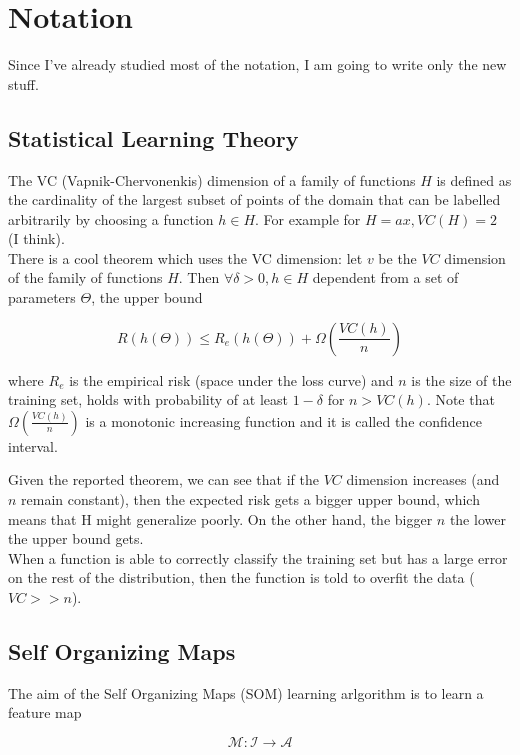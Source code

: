 \section{Notation}

Since I've already studied most of the notation, I am going to write only the new
stuff.

\subsection{Statistical Learning Theory}

The VC (Vapnik-Chervonenkis) dimension of a family of functions $H$ is defined as
the cardinality of the largest subset of points of the domain that can be
labelled arbitrarily by choosing a function $h \in H$.
For example for $H = ax, VC(H) = 2$ (I think).\\
There is a cool theorem which uses the VC dimension: let $v$ be the $VC$
dimension of the family of functions $H$. Then $\forall \delta > 0, h \in H$
dependent from a set of parameters $\Theta$, the upper bound

\begin{equation}
	R(h(\Theta)) \leq R_e(h(\Theta)) + \Omega\left(\frac{VC(h)}{n}\right)
\end{equation}

where $R_e$ is the empirical risk (space under the loss curve) and $n$ is the
size of the training set, holds with probability of at least $1-\delta$ for 
$n > VC(h)$. Note that $\Omega\left(\frac{VC(h)}{n}\right)$ is a monotonic
increasing function and it is called the confidence interval.

Given the reported theorem, we can see that if the $VC$ dimension increases (and
$n$ remain constant), then the expected risk gets a bigger upper bound, which
means that H might generalize poorly. 
On the other hand, the bigger $n$ the lower the upper bound gets.\\
When a function is able to correctly classify the training set but has a large
error on the rest of the distribution, then the function is told to overfit the
data ($VC >> n$).

\subsection{Self Organizing Maps}

The aim of the Self Organizing Maps (SOM) learning arlgorithm is to learn a
feature map 

\begin{equation}
	\label{som_eq}
	\mathcal{M}: \mathcal{I} \rightarrow \mathcal{A}
\end{equation}


